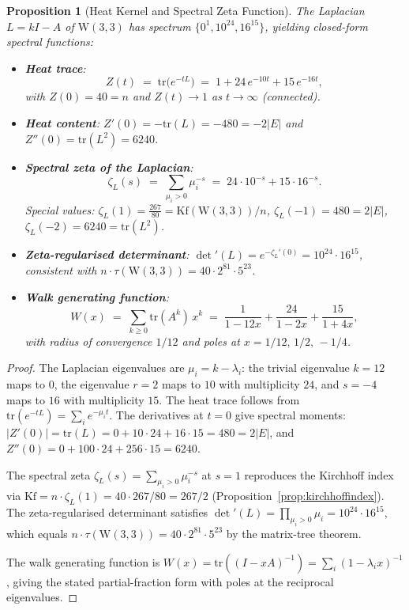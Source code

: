 \documentclass[12pt,a4paper]{article}
\newtheorem{proposition}[theorem]{Proposition}
\newcommand{\W}{\mathrm{W}(3,3)}
\begin{document}
\begin{proposition}[Heat Kernel and Spectral Zeta Function]\label{prop:heatkernel}
The Laplacian $L = kI - A$ of $\W$ has spectrum $\{0^1, 10^{24}, 16^{15}\}$, yielding
closed-form spectral functions:
\begin{itemize}
  \item \textbf{Heat trace}:
        \[
          Z(t) \;=\; \mathrm{tr}\!\bigl(e^{-tL}\bigr) \;=\; 1 + 24\,e^{-10t} + 15\,e^{-16t},
        \]
        with $Z(0) = 40 = n$ and $Z(t) \to 1$ as $t \to \infty$ (connected).
  \item \textbf{Heat content}: $Z'(0) = -\mathrm{tr}(L) = -480 = -2|E|$ and
        $Z''(0) = \mathrm{tr}(L^2) = 6240$.
  \item \textbf{Spectral zeta of the Laplacian}:
        \[
          \zeta_L(s) \;=\; \sum_{\mu_i > 0} \mu_i^{-s} \;=\; 24 \cdot 10^{-s} + 15 \cdot 16^{-s}.
        \]
        Special values: $\zeta_L(1) = \tfrac{267}{80} = \mathrm{Kf}(\W)/n$,\;
        $\zeta_L(-1) = 480 = 2|E|$,\; $\zeta_L(-2) = 6240 = \mathrm{tr}(L^2)$.
  \item \textbf{Zeta-regularised determinant}:
        $\det'(L) = e^{-\zeta_L'(0)} = 10^{24} \cdot 16^{15}$,
        consistent with $n \cdot \tau(\W) = 40 \cdot 2^{81} \cdot 5^{23}$.
  \item \textbf{Walk generating function}:
        \[
          W(x) \;=\; \sum_{k \ge 0} \mathrm{tr}(A^k)\,x^k
               \;=\; \frac{1}{1-12x} + \frac{24}{1-2x} + \frac{15}{1+4x},
        \]
        with radius of convergence $1/12$ and poles at $x = 1/12,\, 1/2,\, -1/4$.
\end{itemize}
\end{proposition}

\begin{proof}
The Laplacian eigenvalues are $\mu_i = k - \lambda_i$: the trivial eigenvalue
$k = 12$ maps to $0$, the eigenvalue $r = 2$ maps to $10$ with multiplicity $24$,
and $s = -4$ maps to $16$ with multiplicity $15$.  The heat trace follows from
$\mathrm{tr}(e^{-tL}) = \sum_i e^{-\mu_i t}$.  The derivatives at $t = 0$ give
spectral moments: $|Z'(0)| = \mathrm{tr}(L) = 0 + 10 \cdot 24 + 16 \cdot 15 = 480 = 2|E|$,
and $Z''(0) = 0 + 100 \cdot 24 + 256 \cdot 15 = 6240$.

The spectral zeta $\zeta_L(s) = \sum_{\mu_i > 0} \mu_i^{-s}$ at $s = 1$ reproduces the
Kirchhoff index via $\mathrm{Kf} = n \cdot \zeta_L(1) = 40 \cdot 267/80 = 267/2$
(Proposition~\ref{prop:kirchhoffindex}).  The zeta-regularised determinant satisfies
$\det'(L) = \prod_{\mu_i > 0} \mu_i = 10^{24} \cdot 16^{15}$, which equals
$n \cdot \tau(\W) = 40 \cdot 2^{81} \cdot 5^{23}$ by the matrix-tree theorem.

The walk generating function is $W(x) = \mathrm{tr}((I - xA)^{-1}) = \sum_i (1 - \lambda_i x)^{-1}$,
giving the stated partial-fraction form with poles at the reciprocal eigenvalues.
\end{proof}
\end{document}

